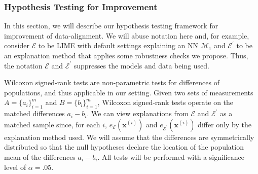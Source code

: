 \documentclass[mnsc,blindrev]{informs3}
\newcommand{\mE}{\mathcal{E}}
\begin{document}
        \subsubsection{Hypothesis Testing for Improvement}
            \label{apx_sec:hypothesis_testing}
            In this section, we will describe our hypothesis testing framework for improvement of data-alignment. We will abuse notation here and, for example, consider $\mE$ to be LIME with default settings explaining an NN $\mathcal{M}_1$ and $\mE^\prime$ to be an explanation method that applies some robustness checks we propose. Thus, the notation $\mE$ and $\mE^\prime$ suppresses the models and data being used.
            
            Wilcoxon signed-rank tests are non-parametric tests for differences of populations, and thus applicable in our setting. Given two sets of measurements $A=\{a_i\}_{i=1}^m$ and $B=\{b_i\}_{i=1}^m$, Wilcoxon signed-rank tests operate on the matched differences $a_i-b_i$. We can view explanations from $\mE$ and $\mE^\prime$ as a matched sample since, for each $i$, $e_{\mE}(\mathbf{x}^{(i)})$ and $e_{\mE^\prime}(\mathbf{x}^{(i)})$ differ only by the explanation method used. We will assume that the differences are symmetrically distributed so that the null hypotheses declare the location of the population mean of the differences $a_i - b_i$. All tests will be performed with a significance level of $\alpha=.05$.
\end{document}
